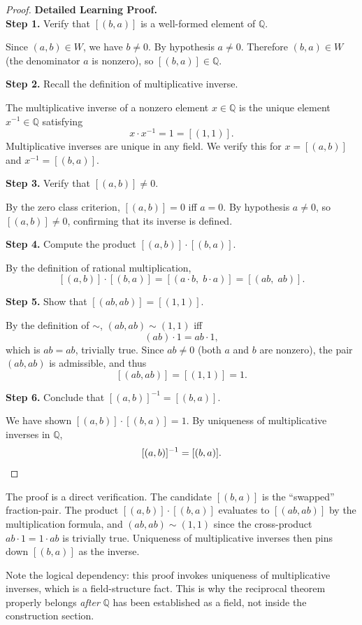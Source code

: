 \begin{proof}
\textbf{Detailed Learning Proof.}~\\

\textbf{Step 1.} Verify that $[(b,a)]$ is a well-formed element of $\mathbb{Q}$.

Since $(a,b)\in W$, we have $b\neq 0$. By hypothesis $a\neq 0$. Therefore
$(b,a)\in W$ (the denominator $a$ is nonzero), so $[(b,a)]\in\mathbb{Q}$.

\textbf{Step 2.} Recall the definition of multiplicative inverse.

The multiplicative inverse of a nonzero element $x\in\mathbb{Q}$ is the
unique element $x^{-1}\in\mathbb{Q}$ satisfying
\[
x\cdot x^{-1} = 1 = [(1,1)].
\]
Multiplicative inverses are unique in any field. We verify this for
$x = [(a,b)]$ and $x^{-1} = [(b,a)]$.

\textbf{Step 3.} Verify that $[(a,b)]\neq 0$.

By the zero class criterion, $[(a,b)] = 0$ iff $a = 0$. By hypothesis
$a\neq 0$, so $[(a,b)]\neq 0$, confirming that its inverse is defined.

\textbf{Step 4.} Compute the product $[(a,b)]\cdot[(b,a)]$.

By the definition of rational multiplication,
\[
[(a,b)]\cdot[(b,a)]
= [(a\cdot b,\; b\cdot a)]
= [(ab,\; ab)].
\]

\textbf{Step 5.} Show that $[(ab,ab)] = [(1,1)]$.

By the definition of $\sim$, $(ab,ab)\sim(1,1)$ iff
\[
(ab)\cdot 1 = ab\cdot 1,
\]
which is $ab = ab$, trivially true. Since $ab\neq 0$ (both $a$ and $b$
are nonzero), the pair $(ab,ab)$ is admissible, and thus
\[
[(ab,ab)] = [(1,1)] = 1.
\]

\textbf{Step 6.} Conclude that $[(a,b)]^{-1} = [(b,a)]$.

We have shown $[(a,b)]\cdot[(b,a)] = 1$. By uniqueness of multiplicative
inverses in $\mathbb{Q}$,
\[
[(a,b)]^{-1} = [(b,a)]. \qedhere
\]
\end{proof}

\begin{remark*}
The proof is a direct verification. The candidate $[(b,a)]$ is the
``swapped'' fraction-pair. The product $[(a,b)]\cdot[(b,a)]$ evaluates
to $[(ab,ab)]$ by the multiplication formula, and $(ab,ab)\sim(1,1)$ since
the cross-product $ab\cdot 1 = 1\cdot ab$ is trivially true. Uniqueness of
multiplicative inverses then pins down $[(b,a)]$ as the inverse.

Note the logical dependency: this proof invokes uniqueness of multiplicative
inverses, which is a field-structure fact. This is why the reciprocal theorem
properly belongs \emph{after} $\mathbb{Q}$ has been established as a field,
not inside the construction section.
\end{remark*}

